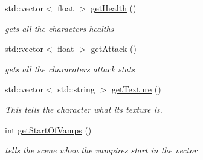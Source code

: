\begin{DoxyCompactItemize}
\mbox{\label{class_file_reader_a6bc93c7b23eddf37b5be069a954ed0d9}} 
std\+::vector$<$ float $>$ \mbox{\hyperlink{class_file_reader_a6bc93c7b23eddf37b5be069a954ed0d9}{get\+Health}} ()
\begin{DoxyCompactList}\small\item\em gets all the characters health\textquotesingle{}s \end{DoxyCompactList}\item 
\mbox{\label{class_file_reader_af5057b4e395f53fd8fdbc50d52c21605}} 
std\+::vector$<$ float $>$ \mbox{\hyperlink{class_file_reader_af5057b4e395f53fd8fdbc50d52c21605}{get\+Attack}} ()
\begin{DoxyCompactList}\small\item\em gets all the characaters attack stats \end{DoxyCompactList}\item 
\mbox{\label{class_file_reader_ae527378ff9f7cae400c526d2580149cd}} 
std\+::vector$<$ std\+::string $>$ \mbox{\hyperlink{class_file_reader_ae527378ff9f7cae400c526d2580149cd}{get\+Texture}} ()
\begin{DoxyCompactList}\small\item\em This tells the character what its texture is. \end{DoxyCompactList}\item 
\mbox{\label{class_file_reader_a8e7d0a24c23871079074ee522f904401}} 
int \mbox{\hyperlink{class_file_reader_a8e7d0a24c23871079074ee522f904401}{get\+Start\+Of\+Vamps}} ()
\begin{DoxyCompactList}\small\item\em tells the scene when the vampires start in the vector \end{DoxyCompactList}\end{DoxyCompactItemize}
